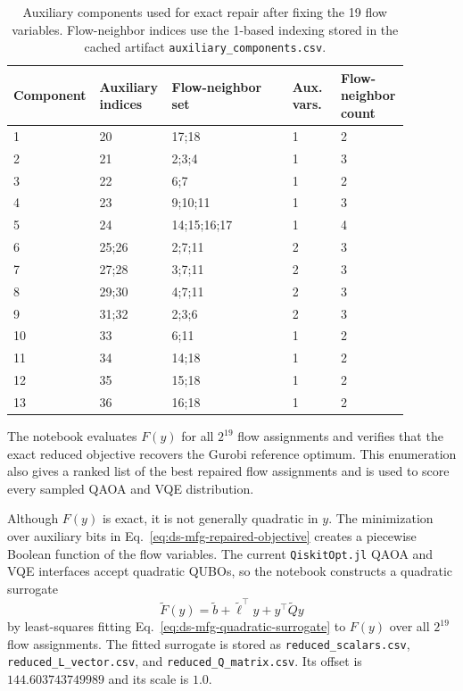 \begin{table}[t]
\centering
\scriptsize
\caption{Auxiliary components used for exact repair after fixing the 19 flow
variables. Flow-neighbor indices use the 1-based indexing stored in the cached
artifact \texttt{auxiliary\_components.csv}.}
\label{tab:ds-mfg-aux-components}
\begin{tabular}{p{0.12\linewidth}p{0.18\linewidth}p{0.30\linewidth}p{0.12\linewidth}p{0.16\linewidth}}
\hline
Component & Auxiliary indices & Flow-neighbor set & Aux. vars. & Flow-neighbor count \\
\hline
1 & 20 & 17;18 & 1 & 2 \\
2 & 21 & 2;3;4 & 1 & 3 \\
3 & 22 & 6;7 & 1 & 2 \\
4 & 23 & 9;10;11 & 1 & 3 \\
5 & 24 & 14;15;16;17 & 1 & 4 \\
6 & 25;26 & 2;7;11 & 2 & 3 \\
7 & 27;28 & 3;7;11 & 2 & 3 \\
8 & 29;30 & 4;7;11 & 2 & 3 \\
9 & 31;32 & 2;3;6 & 2 & 3 \\
10 & 33 & 6;11 & 1 & 2 \\
11 & 34 & 14;18 & 1 & 2 \\
12 & 35 & 15;18 & 1 & 2 \\
13 & 36 & 16;18 & 1 & 2 \\
\hline
\end{tabular}
\end{table}

The notebook evaluates $F(y)$ for all $2^{19}$ flow assignments and verifies
that the exact reduced objective recovers the Gurobi reference optimum. This
enumeration also gives a ranked list of the best repaired flow assignments and
is used to score every sampled QAOA and VQE distribution.

Although $F(y)$ is exact, it is not generally quadratic in $y$. The minimization
over auxiliary bits in Eq.~\eqref{eq:ds-mfg-repaired-objective} creates a
piecewise Boolean function of the flow variables. The current
\texttt{QiskitOpt.jl} QAOA and VQE interfaces accept quadratic QUBOs, so the
notebook constructs a quadratic surrogate
\begin{equation}
    \widetilde{F}(y)
    =
    \widetilde{b}
    + \widetilde{\ell}^{\top} y
    + y^{\top} \widetilde{Q} y
    \label{eq:ds-mfg-quadratic-surrogate}
\end{equation}
by least-squares fitting Eq.~\eqref{eq:ds-mfg-quadratic-surrogate} to
$F(y)$ over all $2^{19}$ flow assignments. The fitted surrogate is stored as
\texttt{reduced\_scalars.csv}, \texttt{reduced\_L\_vector.csv}, and
\texttt{reduced\_Q\_matrix.csv}. Its offset is $144.603743749989$ and its
scale is $1.0$.

